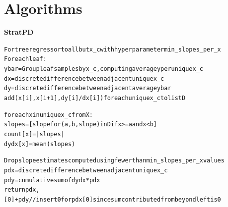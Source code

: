 \documentclass{article}
\begin{document}
\pagebreak
\section{Algorithms}

{\bf StratPD}\begin{alltt}\small
For tree regressor to all but x_c with hyper parameter min_slopes_per_x
For each leaf:
    y bar = Group leaf samples by x_c, computing average y per unique x_c
    dx = discrete difference between adjacent unique x_c
    dy = discrete difference between adjacent average y bar
    add (x[i], x[i+1], dy[i]/dx[i]) for each unique x_c to list D

for each x in unique x_c from X:
    slopes = [slope for (a, b, slope) in D if x >= a and x < b]
    count[x] = |slopes|
    dydx[x] = mean(slopes)

Drop slope estimates computed using fewer than min_slopes_per_x values
pdx = discrete difference between adjacent unique x_c
pdy = cumulative sum of dydx * pdx
return pdx, [0]+pdy  // insert 0 for pdx[0] since sum contributed from beyond left is 0
\end{alltt}
\end{document}
